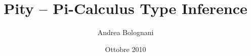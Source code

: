 \documentclass[a4paper]{article}
\begin{document}
\title{Pity -- Pi-Calculus Type Inference}
\author{Andrea Bolognani}
\date{Ottobre 2010}

\maketitle


\begin{abstract}

\end{abstract}


\clearpage

\tableofcontents

\clearpage











\end{document}
